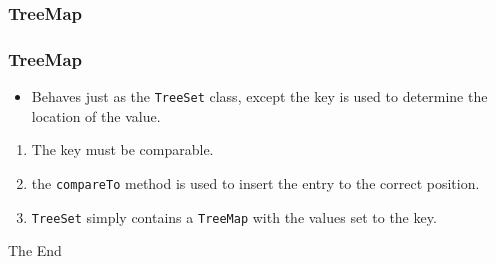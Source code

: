 \documentclass{beamer}
\begin{document}
\subsubsection{TreeMap}
\begin{frame}
\frametitle{TreeMap}
\begin{itemize}
\item Behaves just as the \texttt{TreeSet} class, except the key is used to determine the location of the value.
\end{itemize}
\begin{enumerate}
\item The key must be comparable.
\item the \texttt{compareTo} method is used to insert the entry to the correct position.
\item \texttt{TreeSet} simply contains a \texttt{TreeMap} with the values set to the key. 
\end{enumerate}
\end{frame}
\begin{frame}
\Huge{\centerline{The End}}
\end{frame}

\end{document}
